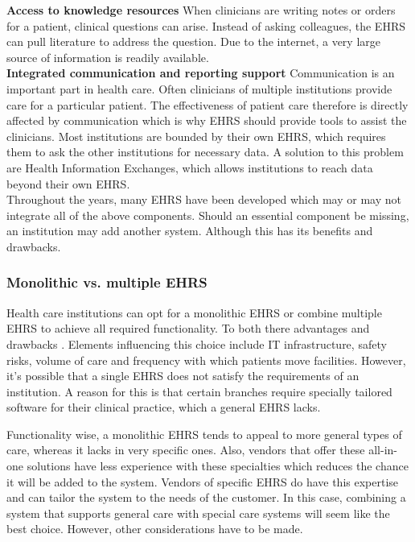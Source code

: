         \noindent\textbf{Access to knowledge resources} When clinicians are writing notes or orders for a patient, clinical questions can arise. Instead of asking colleagues, the EHRS can pull literature to address the question. Due to the internet, a very large source of information is readily available.\\

        \noindent\textbf{Integrated communication and reporting support} Communication is an important part in health care. Often clinicians of multiple institutions provide care for a particular patient. The effectiveness of patient care therefore is directly affected by communication which is why EHRS should provide tools to assist the clinicians. Most institutions are bounded by their own EHRS, which requires them to ask the other institutions for necessary data. A solution to this problem are Health Information Exchanges, which allows institutions to reach data beyond their own EHRS.\\
        
        \noindent Throughout the years, many EHRS have been developed which may or may not integrate all of the above components. Should an essential component be missing, an institution may add another system. Although this has its benefits and drawbacks.

        \subsubsection{Monolithic vs. multiple EHRS} \label{ehrs_comparison}

        Health care institutions can opt for a monolithic EHRS or combine multiple EHRS to achieve all required functionality. To both there advantages and drawbacks \cite{multiple_ehrs}. Elements influencing this choice include IT infrastructure, safety risks, volume of care and frequency with which patients move facilities. However, it's possible that a single EHRS does not satisfy the requirements of an institution. A reason for this is that certain branches require specially tailored software for their clinical practice, which a general EHRS lacks. 

        Functionality wise, a monolithic EHRS tends to appeal to more general types of care, whereas it lacks in very specific ones. Also, vendors that offer these all-in-one solutions have less experience with these specialties which reduces the chance it will be added to the system. Vendors of specific EHRS do have this expertise and can tailor the system to the needs of the customer. In this case, combining a system that supports general care with special care systems will seem like the best choice. However, other considerations have to be made.

